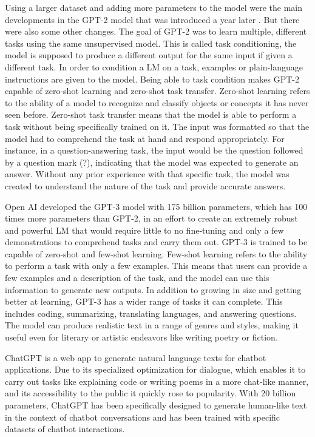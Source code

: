 Using a larger dataset and adding more parameters to the model were the main developments in the GPT-2 model that was introduced a year later \citep{radford2019language}. But there were also some other changes. The goal of GPT-2 was to learn multiple, different tasks using the same unsupervised model. This is called task conditioning, the model is supposed to produce a different output for the same input if given a different task. In order to condition a LM on a task, examples or plain-language instructions are given to the model. Being able to task condition makes GPT-2 capable of zero-shot learning and zero-shot task transfer. Zero-shot learning refers to the ability of a model to recognize and classify objects or concepts it has never seen before. Zero-shot task transfer means that the model is able to perform a task without being specifically trained on it. The input was formatted so that the model had to comprehend the task at hand and respond appropriately. For instance, in a question-answering task, the input would be the question followed by a question mark (?), indicating that the model was expected to generate an answer. Without any prior experience with that specific task, the model was created to understand the nature of the task and provide accurate answers.

Open AI developed the GPT-3 \citep{brown2020gpt3} model with 175 billion parameters, which has 100 times more parameters than GPT-2, in an effort to create an extremely robust and powerful LM that would require little to no fine-tuning and only a few demonstrations to comprehend tasks and carry them out. GPT-3 is trained to be capable of zero-shot and few-shot learning. Few-shot learning refers to the ability to perform a task with only a few examples. This means that users can provide a few examples and a description of the task, and the model can use this information to generate new outputs. In addition to growing in size and getting better at learning, GPT-3 has a wider range of tasks it can complete. This includes coding, summarizing, translating languages, and answering questions. The model can produce realistic text in a range of genres and styles, making it useful even for literary or artistic endeavors like writing poetry or fiction.

ChatGPT \citep{chatgpt} is a web app to generate natural language texts for chatbot applications. Due to its specialized optimization for dialogue, which enables it to carry out tasks like explaining code or writing poems in a more chat-like manner, and its accessibility to the public it quickly rose to popularity. With 20 billion parameters, ChatGPT has been specifically designed to generate human-like text in the context of chatbot conversations and has been trained with specific datasets of chatbot interactions.


